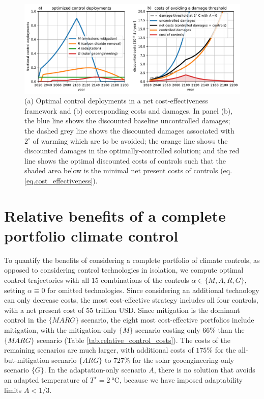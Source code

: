 \documentclass{article}
\begin{document}
\begin{figure}[htb!]
\noindent\includegraphics[width=1.0\textwidth]{figures/default-temp_controls_and_damages.pdf}
\centering
\caption{(a) Optimal control deployments in a net cost-effectiveness framework and (b) corresponding costs and damages. In panel (b), the blue line shows the discounted baseline uncontrolled damages; the dashed grey line shows the discounted damages associated with $2^{\circ}$ of warming which are to be avoided; the orange line shows the discounted damages in the optimally-controlled solution; and the red line shows the optimal discounted costs of controls such that the shaded area below is the minimal net present costs of controls (eq. \ref{eq.cost_effectiveness}).}
\label{fig.approach2}
\end{figure}

\section{Relative benefits of a complete portfolio climate control}
To quantify the benefits of considering a complete portfolio of climate controls, as opposed to considering control technologies in isolation, we compute optimal control trajectories with all $15$ combinations of the controls $\alpha \in \{M, A, R, G\}$, setting $\alpha \equiv 0$ for omitted technologies. Since considering an additional technology can only decrease costs, the most cost-effective strategy includes all four controls, with a net present cost of $55$ trillion USD. Since mitigation is the dominant control in the $\{MARG\}$ scenario, the eight most cost-effective portfolios include mitigation, with the mitigation-only $\{M\}$ scenario costing only $66\%$ than the $\{MARG\}$ scenario (Table \ref{tab.relative_control_costs}). The costs of the remaining scenarios are much larger, with additional costs of $175\%$ for the all-but-mitigation scenario $\{ARG\}$ to $727\%$ for the solar geoengineering-only scenario $\{G\}$. In the adaptation-only scenario $A$, there is no solution that avoids an adapted temperature of $T^{\star} = \SI{2}{\celsius}$, because we have imposed adaptability limits $A < 1/3$.
\end{document}
